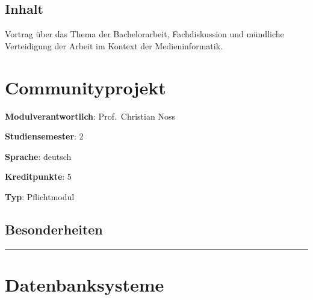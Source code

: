 \hypertarget{inhaltpathlabel....srcmodulbeschreibungen-bachelor-bpo5ba_bachelorkolloquium}{%
\section*{Inhalt\label{../../src/modulbeschreibungen-bachelor-bpo5/BA_Bachelorkolloquium}}\label{inhaltpathlabel....srcmodulbeschreibungen-bachelor-bpo5ba_bachelorkolloquium}}

Vortrag über das Thema der Bachelorarbeit, Fachdiskussion und mündliche
Verteidigung der Arbeit im Kontext der Medieninformatik.

\hypertarget{communityprojektpathlabel....srcmodulbeschreibungen-bachelor-bpo5ba_communityprojekt}{%
\chapter{Communityprojekt\label{../../src/modulbeschreibungen-bachelor-bpo5/BA_Communityprojekt}}\label{communityprojektpathlabel....srcmodulbeschreibungen-bachelor-bpo5ba_communityprojekt}}

\begin{modulHead}
\textbf{Modulverantwortlich}: Prof.~Christian
Noss
\end{modulHead}
\begin{modulHead}
\textbf{Studiensemester}:
2
\end{modulHead}
\begin{modulHead}
\textbf{Sprache}:
deutsch
\end{modulHead}
\begin{modulHead}
\textbf{Kreditpunkte}:
5
\end{modulHead}
\begin{modulHead}
\textbf{Typ}:
Pflichtmodul
\end{modulHead}


\hypertarget{besonderheitenpathlabel....srcmodulbeschreibungen-bachelor-bpo5ba_communityprojekt}{%
\section*{Besonderheiten\label{../../src/modulbeschreibungen-bachelor-bpo5/BA_Communityprojekt}}\label{besonderheitenpathlabel....srcmodulbeschreibungen-bachelor-bpo5ba_communityprojekt}}

\begin{center}\rule{0.5\linewidth}{0.5pt}\end{center}

\hypertarget{datenbanksystemepathlabel....srcmodulbeschreibungen-bachelor-bpo5ba_datenbanksysteme}{%
\chapter{Datenbanksysteme\label{../../src/modulbeschreibungen-bachelor-bpo5/BA_Datenbanksysteme}}\label{datenbanksystemepathlabel....srcmodulbeschreibungen-bachelor-bpo5ba_datenbanksysteme}}

